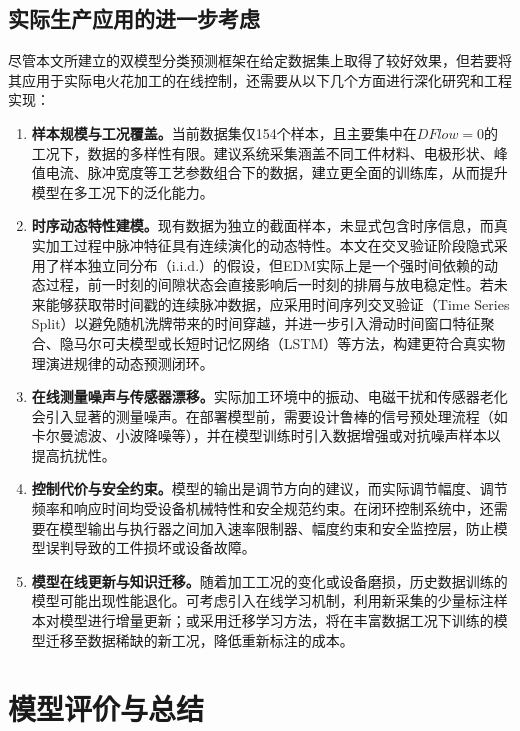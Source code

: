 \documentclass[UTF8,a4paper,12pt]{ctexart}
\begin{document}
\subsection{实际生产应用的进一步考虑}

尽管本文所建立的双模型分类预测框架在给定数据集上取得了较好效果，但若要将其应用于实际电火花加工的在线控制，还需要从以下几个方面进行深化研究和工程实现：

\begin{enumerate}[label=(\arabic*),leftmargin=2em]
\item \textbf{样本规模与工况覆盖。}当前数据集仅154个样本，且主要集中在$DFlow=0$的工况下，数据的多样性有限。建议系统采集涵盖不同工件材料、电极形状、峰值电流、脉冲宽度等工艺参数组合下的数据，建立更全面的训练库，从而提升模型在多工况下的泛化能力。

\item \textbf{时序动态特性建模。}现有数据为独立的截面样本，未显式包含时序信息，而真实加工过程中脉冲特征具有连续演化的动态特性。本文在交叉验证阶段隐式采用了样本独立同分布（i.i.d.）的假设，但EDM实际上是一个强时间依赖的动态过程，前一时刻的间隙状态会直接影响后一时刻的排屑与放电稳定性。若未来能够获取带时间戳的连续脉冲数据，应采用时间序列交叉验证（Time Series Split）以避免随机洗牌带来的时间穿越，并进一步引入滑动时间窗口特征聚合、隐马尔可夫模型或长短时记忆网络（LSTM）等方法，构建更符合真实物理演进规律的动态预测闭环。

\item \textbf{在线测量噪声与传感器漂移。}实际加工环境中的振动、电磁干扰和传感器老化会引入显著的测量噪声。在部署模型前，需要设计鲁棒的信号预处理流程（如卡尔曼滤波、小波降噪等），并在模型训练时引入数据增强或对抗噪声样本以提高抗扰性。

\item \textbf{控制代价与安全约束。}模型的输出是调节方向的建议，而实际调节幅度、调节频率和响应时间均受设备机械特性和安全规范约束。在闭环控制系统中，还需要在模型输出与执行器之间加入速率限制器、幅度约束和安全监控层，防止模型误判导致的工件损坏或设备故障。

\item \textbf{模型在线更新与知识迁移。}随着加工工况的变化或设备磨损，历史数据训练的模型可能出现性能退化。可考虑引入在线学习机制，利用新采集的少量标注样本对模型进行增量更新；或采用迁移学习方法，将在丰富数据工况下训练的模型迁移至数据稀缺的新工况，降低重新标注的成本。
\end{enumerate}

\section{模型评价与总结}
\end{document}
